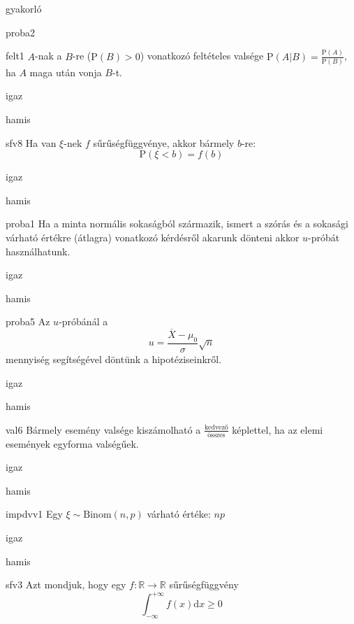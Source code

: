 \documentclass[12pt]{article}
\begin{document}
\begin{quiz}{gyakorló}
\begin{multi}[feedback={A szórást ismerni kell.}]{proba2}
\end{multi}
\begin{multi}[feedback={Def.+$P(AB)=P(A)$ a feltételekből.}]{felt1}
$A$-nak a $B$-re ($\mathrm{P}(B)>0$) vonatkozó feltételes valsége $\mathrm{P}(A|B)=\frac{\mathrm{P}(A)}{\mathrm{P}(B)}$, ha $A$ maga után vonja $B$-t.
\item* igaz
\item hamis
\end{multi}
\begin{multi}[feedback={Def.}]{sfv8}
Ha van $\xi$-nek $f$ sűrűségfüggvénye, akkor bármely $b$-re:
$$
\mathrm{P}(\xi<b)=f(b)
$$
\item igaz
\item* hamis
\end{multi}
\begin{multi}[feedback={Ezek az $u$-próba használatának előzményei.}]{proba1}
Ha a minta normális sokaságból származik, ismert a szórás és a sokasági várható értékre (átlagra) vonatkozó kérdésről 
akarunk dönteni akkor $u$-próbát használhatunk.
\item* igaz
\item hamis
\end{multi}
\begin{multi}[feedback={A fenti formula az $u$-próba ún. próbastatisztikája.}]{proba5}
Az $u$-próbánál a 
$$
u=\frac{\overline{X}-\mu_0}{\sigma}\sqrt{n}
$$
mennyiség segítségével döntünk a hipotéziseinkről.
\item* igaz
\item hamis
\end{multi}
\begin{multi}[feedback={Additívitás.}]{val6}
Bármely esemény valsége kiszámolható a $\frac{\text{kedvező}}{\text{összes}}$ képlettel, ha az elemi események 
egyforma valségűek.
\item* igaz
\item hamis
\end{multi}
\begin{multi}[feedback={$\xi=\xi_1+{...\:}+\xi_n$, ahol $\xi_k$ Bernoulli és $\mathrm{E}(\xi)=p$+additívitás}]{impdvv1}
Egy $\xi\sim \mathrm{Binom}(n,p)$ várható értéke: $np$
\item* igaz
\item hamis
\end{multi}
\begin{multi}[feedback={$f\ge 0$ fontos (monoton nemcsökkenő $F$-nek a deriváltja)}]{sfv3}
Azt mondjuk, hogy egy $f:\mathbb{R}\to \mathbb{R}$ sűrűségfüggvény 
$$
\int_{-\infty}^{+\infty}f(x)\mathrm{d } x\ge 0
$$
\end{multi}
\end{quiz}
\end{document}
